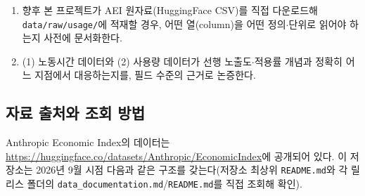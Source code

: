 \documentclass[11pt]{article}
\begin{document}
\begin{enumerate}[label=(\arabic*)]
  \item 향후 본 프로젝트가 AEI 원자료(HuggingFace CSV)를 직접 다운로드해 \texttt{data/raw/usage/}에 적재할 경우, 어떤 열(column)을 어떤 정의$\cdot$단위로 읽어야 하는지 사전에 문서화한다.
  \item (1) 노동시간 데이터와 (2) 사용량 데이터가 선행 노출도$\cdot$적용률 개념과 정확히 어느 지점에서 대응하는지를, 필드 수준의 근거로 논증한다.
\end{enumerate}

\subsection{자료 출처와 조회 방법}

Anthropic Economic Index의 데이터는 \url{https://huggingface.co/datasets/Anthropic/EconomicIndex}에 공개되어 있다. 이 저장소는 2026년 9월 시점 다음과 같은 구조를 갖는다(저장소 최상위 \texttt{README.md}와 각 릴리스 폴더의 \texttt{data\_documentation.md}/\texttt{README.md}를 직접 조회해 확인).
\end{document}
